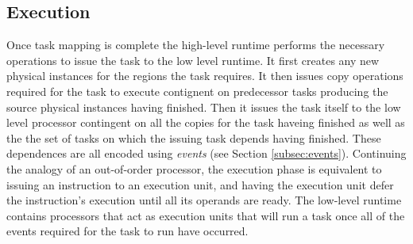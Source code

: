 \subsection{Execution}
\label{subsec:execution}
Once task mapping is complete the high-level runtime performs the necessary operations
to issue the task to the low level runtime.  It first creates any new physical instances
for the regions the task requires.  It then issues copy operations required
for the task to execute contignent on predecessor tasks producing the source physical instances
having finished.  Then it issues the task itself to the low level processor contingent
on all the copies for the task haveing finished as well as the the set of tasks
on which the issuing task depends having finished.  These dependences are all encoded
using {\em events} (see Section \ref{subsec:events}).  Continuing the analogy of an out-of-order
processor, the execution phase is equivalent to issuing an instruction to an
execution unit, and having the execution unit defer the instruction's execution until all its
operands are ready.  The low-level runtime contains processors that act as execution
units that will run a task once all of the events required for the task to run
have occurred. 



